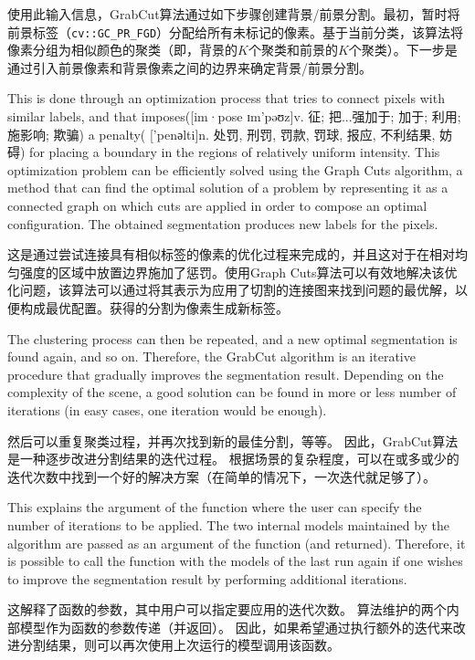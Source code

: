 \documentclass[]{article}
\begin{document}
使用此输入信息，GrabCut算法通过如下步骤创建背景/前景分割。最初，暂时将前景标签（\texttt{cv::GC\_PR\_FGD}）分配给所有未标记的像素。基于当前分类，该算法将像素分组为相似颜色的聚类（即，背景的\(K\)个聚类和前景的\(K\)个聚类）。下一步是通过引入前景像素和背景像素之间的边界来确定背景/前景分割。

This is done through an optimization process that tries to connect
pixels with similar labels, and that imposes({[}im·pose
\textbar{}\textbar{} ɪm'pəʊz{]}v. 征; 把...强加于; 加于; 利用; 施影响;
欺骗) a penalty( {[}'penәlti{]}n. 处罚, 刑罚, 罚款, 罚球, 报应,
不利结果, 妨碍) for placing a boundary in the regions of relatively
uniform intensity. This optimization problem can be efficiently solved
using the Graph Cuts algorithm, a method that can find the optimal
solution of a problem by representing it as a connected graph on which
cuts are applied in order to compose an optimal configuration. The
obtained segmentation produces new labels for the pixels.

这是通过尝试连接具有相似标签的像素的优化过程来完成的，并且这对于在相对均匀强度的区域中放置边界施加了惩罚。使用Graph
Cuts算法可以有效地解决该优化问题，该算法可以通过将其表示为应用了切割的连接图来找到问题的最优解，以便构成最优配置。获得的分割为像素生成新标签。

The clustering process can then be repeated, and a new optimal
segmentation is found again, and so on. Therefore, the GrabCut algorithm
is an iterative procedure that gradually improves the segmentation
result. Depending on the complexity of the scene, a good solution can be
found in more or less number of iterations (in easy cases, one iteration
would be enough).

然后可以重复聚类过程，并再次找到新的最佳分割，等等。
因此，GrabCut算法是一种逐步改进分割结果的迭代过程。
根据场景的复杂程度，可以在或多或少的迭代次数中找到一个好的解决方案（在简单的情况下，一次迭代就足够了）。

This explains the argument of the function where the user can specify
the number of iterations to be applied. The two internal models
maintained by the algorithm are passed as an argument of the function
(and returned). Therefore, it is possible to call the function with the
models of the last run again if one wishes to improve the segmentation
result by performing additional iterations.

这解释了函数的参数，其中用户可以指定要应用的迭代次数。
算法维护的两个内部模型作为函数的参数传递（并返回）。
因此，如果希望通过执行额外的迭代来改进分割结果，则可以再次使用上次运行的模型调用该函数。
\end{document}
